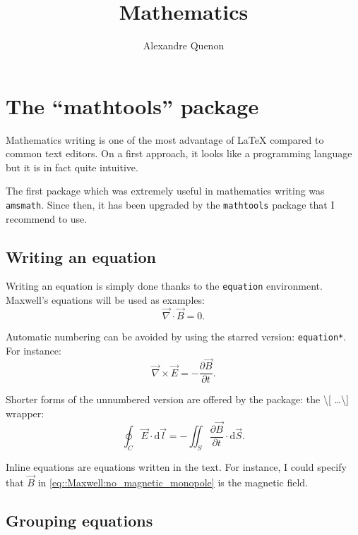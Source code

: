 \documentclass[11pt, a4paper]{report}
\title{Mathematics}
\author{Alexandre Quenon}
\begin{document}
\maketitle

\tableofcontents


\chapter{The \enquote{mathtools} package}

	Mathematics writing is one of the most advantage of \LaTeX{} compared to common text editors.
	On a first approach, it looks like a programming language but it is in fact quite intuitive.
	
	The first package which was extremely useful in mathematics writing was \texttt{amsmath}.
	Since then, it has been upgraded by the \texttt{mathtools} package that I recommend to use.
	
	
	\section{Writing an equation}
	
		Writing an equation is simply done thanks to the \texttt{equation} environment.
		Maxwell's equations will be used as examples:
		\begin{equation}
			\vec{\nabla}\cdot\vec{B}=0.
			\label{eq::Maxwell:no_magnetic_monopole}
		\end{equation}
		
		Automatic numbering can be avoided by using the starred version: \texttt{equation*}.
		For instance:
		\begin{equation*}
			\vec{\nabla}\times\vec{E}=-\frac{\partial\vec{B}}{\partial t}.
		\end{equation*}
		
		Shorter forms of the unnumbered version are offered by the package: the \textbackslash [ \ldots \textbackslash ] wrapper:
		\[ \oint_{C} \vec{E} \cdot \mathrm{d}\vec{l} = - \iint_{S} \frac{\partial\vec{B}}{\partial t} \cdot \mathrm{d}\vec{S}. \]
		
		Inline equations are equations written in the text.
		For instance, I could specify that $\vec{B}$ in \cref{eq::Maxwell:no_magnetic_monopole} is the magnetic field.
	
	
	\section{Grouping equations}
	
\end{document}
